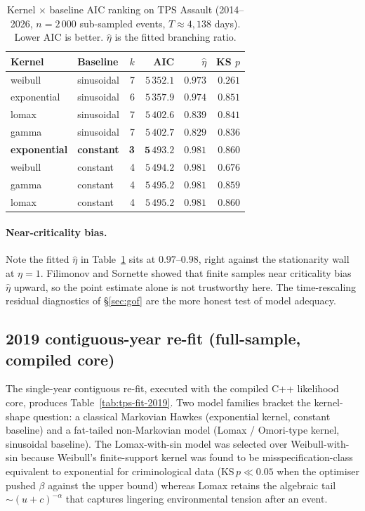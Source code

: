\documentclass[article,shortnames,nojss]{jss}
\newcommand{\1}{\mathbbm{1}}
\theoremstyle{plain}
\theoremstyle{definition}
\begin{document}
\begin{table}[h]
\centering\footnotesize
\caption{Kernel $\times$ baseline AIC ranking on TPS Assault
(2014--2026, $n=2\,000$ sub-sampled events, $T\approx 4{,}138$ days).
Lower AIC is better.  $\hat\eta$ is the fitted branching ratio.}
\label{tab:tps-fit}
\begin{tabular}{llrrrr}
\toprule
Kernel & Baseline & $k$ & AIC & $\hat\eta$ & KS $p$\\\midrule
weibull        & sinusoidal & 7 & $5\,352.1$ & $0.973$ & $0.261$\\
exponential    & sinusoidal & 6 & $5\,357.9$ & $0.974$ & $0.851$\\
lomax          & sinusoidal & 7 & $5\,402.6$ & $0.839$ & $0.841$\\
gamma          & sinusoidal & 7 & $5\,402.7$ & $0.829$ & $0.836$\\
\textbf{exponential} & \textbf{constant}   & \textbf{3} & $\mathbf{5\,493.2}$ & $\mathbf{0.981}$ & $\mathbf{0.860}$\\
weibull        & constant   & 4 & $5\,494.2$ & $0.981$ & $0.676$\\
gamma          & constant   & 4 & $5\,495.2$ & $0.981$ & $0.859$\\
lomax          & constant   & 4 & $5\,495.2$ & $0.981$ & $0.860$\\
\bottomrule
\end{tabular}
\end{table}

\paragraph{Near-criticality bias.}
Note the fitted $\hat\eta$ in Table~\ref{tab:tps-fit} sits at $0.97$--$0.98$, right against the stationarity wall at $\eta=1$.  Filimonov and Sornette \citep{filimonov2015apparent} showed that finite samples near criticality bias $\hat\eta$ upward, so the point estimate alone is not trustworthy here.  The time-rescaling residual diagnostics of §\ref{sec:gof} are the more honest test of model adequacy.

\subsection{2019 contiguous-year re-fit (full-sample, compiled core)}\label{sec:application-2019}

The single-year contiguous re-fit, executed with the compiled C++
likelihood core, produces Table~\ref{tab:tps-fit-2019}.
Two model families bracket the kernel-shape question: a
classical Markovian Hawkes (exponential kernel, constant
baseline) and a fat-tailed non-Markovian model (Lomax /
Omori-type kernel, sinusoidal baseline).  The Lomax-with-sin
model was selected over Weibull-with-sin because Weibull's
finite-support kernel was found to be misspecification-class
equivalent to exponential for criminological data
(KS\,$p \ll 0.05$ when the optimiser pushed $\beta$ against
the upper bound) whereas Lomax retains the algebraic tail
$\sim (u+c)^{-\alpha}$ that captures lingering environmental
tension after an event.
\end{document}
